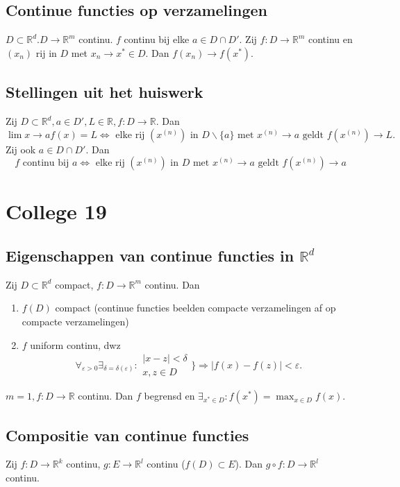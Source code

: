 \documentclass{2wa40summary}
\begin{document}
		\subsection{Continue functies op verzamelingen}
			$D \subset \mathbb{R}^d. D \rightarrow \mathbb{R}^m$ continu. $f$ continu bij elke $a \in D\cap D'$.
			\opm Zij $f:D\rightarrow \mathbb{R}^m$ continu en $(x_n)$ rij in $D$ met $x_n \rightarrow x^* \in D$.
			  Dan $f(x_n) \rightarrow f(x^*).$
	   \subsection{Stellingen uit het huiswerk}
            \theorem Zij $D \subset \mathbb{R}^d, a \in D', L \in \mathbb{R}, f:D \rightarrow \mathbb{R}$. Dan
            \[\lim{x \rightarrow a}f(x)=L \Leftrightarrow \text{ elke rij } (x^{(n)}) \text{ in } D \backslash \{a\} \text{ met } x^{(n)} \rightarrow a \text{ geldt } f(x^{(n)}) \rightarrow L.\]
            Zij ook $a \in D \cap D'$. Dan
            \[f \text{ continu bij } a \Leftrightarrow \text{ elke rij }(x^{(n)}) \text{ in } D \text{ met } x^{(n)} \rightarrow a \text{ geldt } f(x^{(n)}) \rightarrow a\]
	\newpage
	\section{College 19}
		\subsection{Eigenschappen van continue functies in $\mathbb{R}^d$}
			\theorem Zij $D \subset \mathbb{R}^d$ compact, $f:D\rightarrow\mathbb{R}^m$ continu. Dan
				\begin{enumerate}[(1)]
					\item $f(D)$ compact (continue functies beelden compacte verzamelingen af op compacte verzamelingen)
					\item $f$ uniform continu, dwz \[\forall _{\varepsilon >0} \exists _{\delta = \delta (\varepsilon)}: \begin{array}{lr}
						|x-z|<\delta \\
						x,z\in D
					\end{array}\bigg\}  \Rightarrow |f(x)-f(z)|<\varepsilon.\]
				\end{enumerate}
			\gevolg[1] $m=1, f:D\rightarrow \mathbb{R}$ continu. Dan $f$ begrensd en $\exists _{x^* \in D}:f(x^*)=\max_{x\in D}f(x)$.
			
		\subsection{Compositie van continue functies}
			\theorem Zij $f:D\rightarrow \mathbb{R}^k$ continu, $g:E\rightarrow \mathbb{R}^l$ continu ($f(D) \subset E$). Dan $g \circ f: D\rightarrow \mathbb{R}^l$ continu.
		
\end{document}
